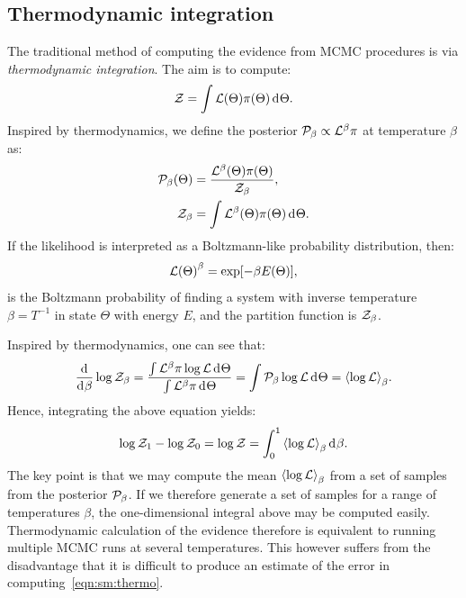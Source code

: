 \subsection{Thermodynamic integration}
The traditional method of computing the evidence from MCMC procedures is via {\em thermodynamic integration}.
The aim is to compute:
\begin{equation}
  \mathcal{Z} = \int \mathcal{L}(\Theta) \pi(\Theta) \operatorname{d}^{}\!{\Theta}.
\end{equation}
Inspired by thermodynamics, we define the posterior \(\mathcal{P}_\beta \propto \mathcal{L}^\beta\pi\) at temperature \(\beta\) as:
\begin{align}
  \mathcal{P}_\beta(\Theta) &= \frac{\mathcal{L}^{\beta}(\Theta) \pi(\Theta)}{\mathcal{Z}_\beta}, 
  \label{eqn:bay:posteriorb}
  \\
  \mathcal{Z}_\beta &= \int\mathcal{L}^{\beta}(\Theta) \pi(\Theta) \operatorname{d}^{}\!{\Theta}.
  \label{eqn:bay:evb}
\end{align}
If the likelihood is interpreted as a Boltzmann-like probability distribution, then:
\begin{equation}
{\mathcal{L}(\Theta)}^\beta = \exp[-\beta E(\Theta)],
\end{equation}
is the Boltzmann probability of finding a system with inverse temperature \(\beta = T^{-1}\) in state \(\Theta\) with energy \(E\), and the partition function is \(\mathcal{Z}_\beta\).

Inspired by thermodynamics, one can see that:
\begin{equation}
  \frac{\operatorname{d}^{}\!{}}{\operatorname{d}^{}\!{\beta}}\log\mathcal{Z}_\beta = \frac{\int  \mathcal{L}^\beta \pi \log\mathcal{L}\operatorname{d}^{}\!{\Theta}}{\int\mathcal{L}^\beta\pi \operatorname{d}^{}\!{\Theta}} = \int \mathcal{P}_\beta \log\mathcal{L}\operatorname{d}^{}\!{\Theta} =  {\left\langle{\log\mathcal{L}}\right\rangle}_\beta.
  \label{eqn:bay:thermo}
\end{equation}
Hence, integrating the above equation yields:
\begin{equation}
  \log\mathcal{Z}_1-\log\mathcal{Z}_0 = \log\mathcal{Z} = \int_{0}^{1}{\left\langle{\log\mathcal{L}}\right\rangle}_\beta\operatorname{d}^{}\!{\beta}.
  \label{eqn:sm:thermo}
\end{equation}
The key point is that we may compute the mean \({\left\langle{\log\mathcal{L}}\right\rangle}_\beta\) from a set of samples from the posterior \(\mathcal{P}_\beta\). If we therefore generate a set of samples for a range of temperatures \(\beta\), the one-dimensional integral above may be computed easily. Thermodynamic calculation of the evidence therefore is equivalent to running multiple MCMC runs at several temperatures.
This however suffers from the disadvantage that it is difficult to produce an estimate of the error in computing~\eqref{eqn:sm:thermo}. 

